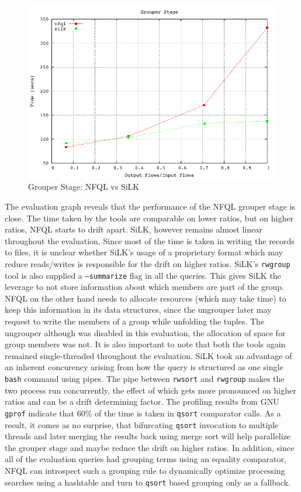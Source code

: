 \begin{figure}[ht!]
  \begin{center}
    \includegraphics* [width=0.8\linewidth]{figures/benchmarks/grouper}
    \caption{Grouper Stage: NFQL vs SiLK}
    \label{fig:benchmarks-grouper}
  \end{center}
\end{figure}

The evaluation graph reveals that the performance of the \ac{NFQL} grouper
stage is close. The time taken by the tools are comparable on lower ratios,
but on higher ratios, \ac{NFQL} starts to drift apart. SiLK, however remains
almost linear throughout the evaluation. Since most of the time is taken in
writing the records to files, it is unclear whether SiLK's usage of a
proprietary format which may reduce reads/writes is responsible for the drift
on higher ratios. SiLK's \texttt{rwgroup} tool is also supplied a
\texttt{--summarize} flag in all the queries. This gives SiLK the leverage to
not store information about which members are part of the group.  \ac{NFQL} on
the other hand needs to allocate resources (which may take time) to keep this
information in its data structures, since  the ungrouper later may request to write the members of a group
while unfolding the tuples.  The ungrouper although was disabled in this
evaluation, the allocation of space for group members was not. It is also
important to note that both the tools again remained single-threaded
throughout the evaluation. SiLK took an advantage of an inherent concurency
arising from how the query is structured as one single \texttt{bash} command
using pipes. The pipe between \texttt{rwsort} and \texttt{rwgroup} makes the
two process run concurrently, the effect of which gets more pronounced on
higher ratios and can be a drift determining factor. The profiling results
from GNU \texttt{gprof} \cite{graham:1982} indicate that $60\%$ of the time is
taken in \texttt{qsort} comparator calls.  As a result, it comes as no
surprise, that bifurcating \texttt{qsort} invocation to multiple threads and
later merging the results back using merge sort will help parallelize the
grouper stage and maybe reduce the drift on higher ratios. In addition, since
all of the evaluation queries had grouping terms using an equality comparator,
\ac{NFQL} can introspect such a grouping rule to dynamically optimize
processing searches using a hashtable and turn to \texttt{qsort} based
grouping only as a fallback.


